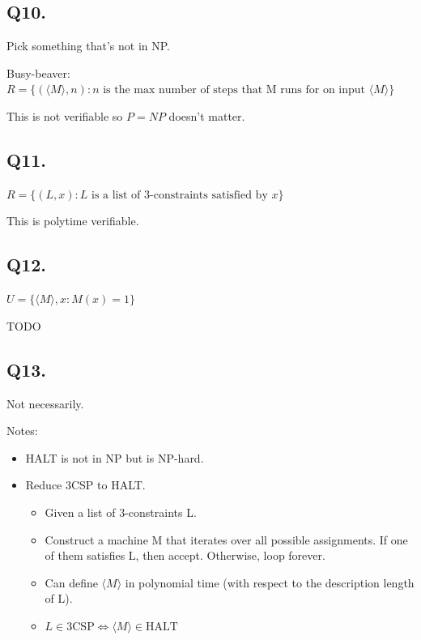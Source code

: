 \documentclass[letterpaper]{article}
\begin{document}
\subsection*{Q10.}

Pick something that's not in NP.

Busy-beaver:
$R = \{ (\langle M \rangle, n) : n \text{ is the max number of steps that M runs for on input } \langle M\rangle \}$

This is not verifiable so $P = NP$ doesn't matter.

\subsection*{Q11.}

$R = \{ (L,x) : L \text{ is a list of 3-constraints satisfied by } x \} $

This is polytime verifiable.

\subsection*{Q12.}

$U = \{ \langle M \rangle , x : M(x) = 1 \}$

TODO

\subsection*{Q13.}

Not necessarily.

Notes:
\begin{itemize}
  \item HALT is not in NP but is NP-hard.
  \item Reduce 3CSP to HALT.
        \begin{itemize}
          \item Given a list of 3-constraints L.
          \item Construct a machine M that iterates over all possible assignments.
                If one of them satisfies L, then accept.
                Otherwise, loop forever.
          \item Can define $\langle M \rangle$ in polynomial time (with respect to the description length of L).
          \item $L \in \text{3CSP} \iff \langle M \rangle \in \text{HALT}$
        \end{itemize}
\end{itemize}
\end{document}
